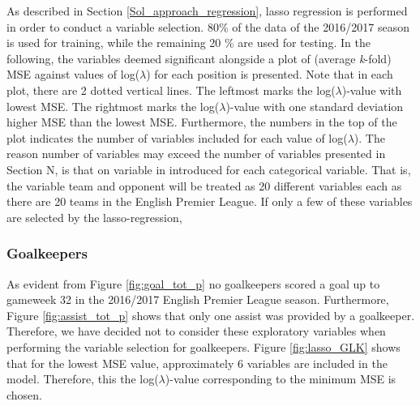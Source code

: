 As described in Section \ref{Sol_approach_regression}, lasso regression is performed in order to conduct a variable selection. 80\% of the data of the 2016/2017 season is used for training, while the remaining 20 \% are used for testing. In the following, the variables deemed significant alongside a plot of (average \textit{k}-fold) MSE against values of log($\lambda$) for each position is presented. Note that in each plot, there are 2 dotted vertical lines. The leftmost marks the log($\lambda$)-value with lowest MSE. The rightmost marks the log($\lambda$)-value with one standard deviation higher MSE than the lowest MSE. Furthermore, the numbers in the top of the plot indicates the number of variables included for each value of log($\lambda$). The reason number of variables may exceed the number of variables presented in Section N, is that on variable in introduced for each categorical variable. That is, the variable team and opponent will be treated as 20 different variables each as there are 20 teams in the English Premier League. If only a few of these variables are selected by the lasso-regression, 

\newpar

\subsubsection{Goalkeepers}
As evident from Figure \ref{fig:goal_tot_p} no goalkeepers scored a goal up to gameweek 32 in the 2016/2017 English Premier League season. Furthermore, Figure \ref{fig:assist_tot_p} shows that only one assist was provided by a goalkeeper. Therefore, we have decided not to consider these exploratory variables when performing the variable selection for goalkeepers. Figure \ref{fig:lasso_GLK} shows that for the lowest MSE value, approximately 6 variables are included in the model. Therefore, this the log($\lambda$)-value corresponding to the minimum MSE is chosen.

